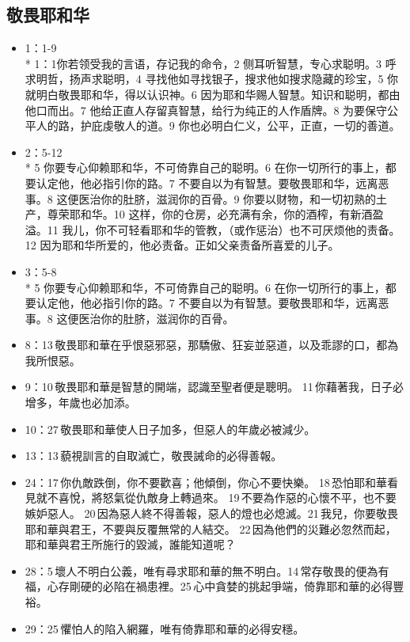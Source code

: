 \subsection{敬畏耶和华}
\begin{itemize}
\itemsep-.45em 
\item 1：1-9 \\*
1：1你若领受我的言语，存记我的命令，2 侧耳听智慧，专心求聪明。3 呼求明哲，扬声求聪明，4 寻找他如寻找银子，搜求他如搜求隐藏的珍宝，5 你就明白敬畏耶和华，得以认识神。6 因为耶和华赐人智慧。知识和聪明，都由他口而出。7 他给正直人存留真智慧，给行为纯正的人作盾牌。8 为要保守公平人的路，护庇虔敬人的道。9 你也必明白仁义，公平，正直，一切的善道。
\item 2：5-12 \\*
5 你要专心仰赖耶和华，不可倚靠自己的聪明。6 在你一切所行的事上，都要认定他，他必指引你的路。7 不要自以为有智慧。要敬畏耶和华，远离恶事。8 这便医治你的肚脐，滋润你的百骨。9 你要以财物，和一切初熟的土产，尊荣耶和华。10 这样，你的仓房，必充满有余，你的酒榨，有新酒盈溢。11 我儿，你不可轻看耶和华的管教，（或作惩治）也不可厌烦他的责备。12 因为耶和华所爱的，他必责备。正如父亲责备所喜爱的儿子。
\item 3：5-8 \\*
5 你要专心仰赖耶和华，不可倚靠自己的聪明。6 在你一切所行的事上，都要认定他，他必指引你的路。7 不要自以为有智慧。要敬畏耶和华，远离恶事。8 这便医治你的肚脐，滋润你的百骨。
\item 8：13 敬畏耶和華在乎恨惡邪惡，那驕傲、狂妄並惡道，以及乖謬的口，都為我所恨惡。
\item 9：10 敬畏耶和華是智慧的開端，認識至聖者便是聰明。 11 你藉著我，日子必增多，年歲也必加添。
\item 10：27 敬畏耶和華使人日子加多，但惡人的年歲必被減少。
\item 13：13 藐視訓言的自取滅亡，敬畏誡命的必得善報。
\item 24：17 你仇敵跌倒，你不要歡喜；他傾倒，你心不要快樂。 18 恐怕耶和華看見就不喜悅，將怒氣從仇敵身上轉過來。 19 不要為作惡的心懷不平，也不要嫉妒惡人。 20 因為惡人終不得善報，惡人的燈也必熄滅。21 我兒，你要敬畏耶和華與君王，不要與反覆無常的人結交。 22 因為他們的災難必忽然而起，耶和華與君王所施行的毀滅，誰能知道呢？
\item 28：5 壞人不明白公義，唯有尋求耶和華的無不明白。14 常存敬畏的便為有福，心存剛硬的必陷在禍患裡。25 心中貪婪的挑起爭端，倚靠耶和華的必得豐裕。
\item 29：25 懼怕人的陷入網羅，唯有倚靠耶和華的必得安穩。
\end{itemize}

